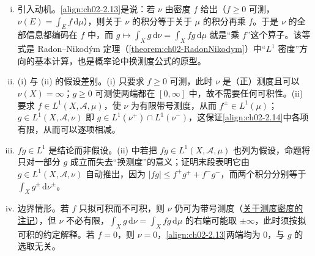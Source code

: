 \documentclass[../../main.tex]{subfiles}%
\begin{document}
\begin{remark}\label{remark:ch02-变量替换积分动机}
\begin{enumerate}[(i)]
\item 引入动机。\eqref{align:ch02-2.13}是说：若 $\nu$ 由密度 $f$ 给出（$f\geqslant0$ 可测，$\nu(E)=\int_Ef\,\mathrm{d}\mu$），则关于 $\nu$ 的积分等于关于 $\mu$ 的积分再乘 $f$。于是 $\nu$ 的全部信息都编码在 $f$ 中，而 $g\mapsto\int_Xg\,\mathrm{d}\nu=\int_Xfg\,\mathrm{d}\mu$ 就是“乘 $f$”这个算子。该等式是 Radon--Nikodým 定理（\cref{theorem:ch02-RadonNikodym}）中“$L^1$ 密度”方向的基本计算，也是概率论中换测度公式的原型。
\item (i) 与 (ii) 的假设差别。(i) 只要求 $f\geqslant0$ 可测，此时 $\nu$ 是（正）测度且可以 $\nu(X)=\infty$；$g\geqslant0$ 可测使两端都在 $[0,\infty]$ 中，故不需要任何可积性。(ii) 要求 $f\in L^1(X,\mathscr A,\mu)$，使 $\nu$ 为有限带号测度，从而 $f^\pm\in L^1(\mu)$；$g\in L^1(X,\mathscr A,\nu)$ 即 $g\in L^1(\nu^+)\cap L^1(\nu^-)$，这保证\eqref{align:ch02-2.14}中各项有限，从而可以逐项相减。
\item $fg\in L^1$ 是结论而非假设。(ii) 中若把 $fg\in L^1(X,\mathscr A,\mu)$ 也列为假设，命题将只对一部分 $g$ 成立而失去“换测度”的意义；证明末段表明它由 $g\in L^1(X,\mathscr A,\nu)$ 自动推出，因为 $|fg|\leqslant f^+g^++f^-g^-$，而两个积分分别等于 $\int_Xg^\pm\,\mathrm{d}\nu^\pm$。
\item 边界情形。若 $f$ 只拟可积而不可积，则 $\nu$ 仍可为带号测度（\hyperref[remark:ch02-测度密度]{关于测度密度的注记}），但 $\nu$ 不必有限，$\int_Xg\,\mathrm{d}\nu=\int_Xfg\,\mathrm{d}\mu$ 的右端可能取 $\pm\infty$，此时须按拟可积的约定解释。若 $f=0$，则 $\nu=0$，\eqref{align:ch02-2.13}两端均为 $0$，与 $g$ 的选取无关。
\end{enumerate}
\end{remark}
\end{document}
